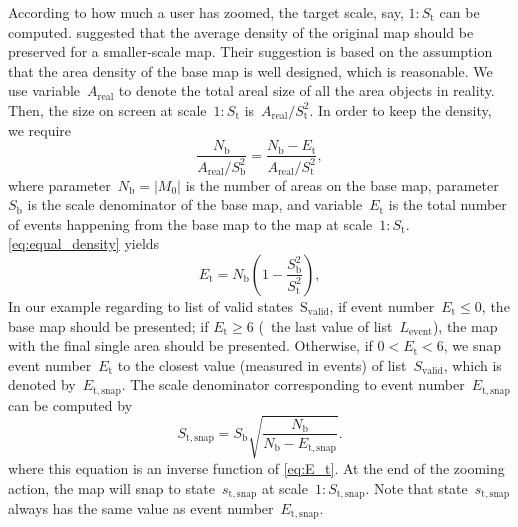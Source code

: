 \documentclass[]{interact}
\begin{document}
According to how much a user has zoomed,
the target scale, say, $1:S_\mathrm{t}$ can be computed.
\citet{Huang2016Webmap} suggested that 
the average density of the original map should be preserved 
for a smaller-scale map.
Their suggestion is based on the assumption that 
the area density of the base map is well designed, which is reasonable.
We use variable~$A_\mathrm{real}$ to denote the total areal size of 
all the area objects in reality.
Then, the size on screen at scale~$1:S_\mathrm{t}$ 
is~$A_\mathrm{real} \big/ S^2_\mathrm{t}$.
In order to keep the density, we require
\begin{equation}
\label{eq:equal_density}
\frac{N_\mathrm{b}}{A_\mathrm{real} \big/ S^2_\mathrm{b}} =
\frac{N_\mathrm{b}-E_\mathrm{t}}{A_\mathrm{real} \big/ S^2_\mathrm{t}},
\end{equation}
where parameter~$N_\mathrm{b} = |M_0|$ 
is the number of areas on the base map,
parameter~$S_\mathrm{b}$ is the scale denominator of the base map,
and variable~$E_\mathrm{t}$ is the total number of events 
happening from the base map to the map at scale~$1:S_\mathrm{t}$.
\eq\ref{eq:equal_density} yields
\begin{equation}
\label{eq:E_t}
E_\mathrm{t} = N_\mathrm{b} \left(1-\frac{S^2_\mathrm{b}}{S^2_\mathrm{t}}\right),
\end{equation}
In our example regarding to list of valid states~$\mathrm{S_\mathrm{valid}}$,
if event number~$E_\mathrm{t} \le 0$, the base map should be presented;
if $E_\mathrm{t} \ge 6$ (\ie~the last value of list~$L_\mathrm{event}$),
the map with the final single area should be presented.
Otherwise, if $0<E_\mathrm{t} < 6$, we snap event number~$E_\mathrm{t}$ 
to the closest value (measured in events) of list~$S_\mathrm{valid}$,
which is denoted by~$E_\mathrm{t,snap}$.
The scale denominator corresponding to event number~$E_\mathrm{t,snap}$
can be computed by 
\begin{equation}
\label{eq:S_t_snap}
S_\mathrm{t,snap} = S_\mathrm{b} \sqrt{\frac{N_\mathrm{b}}{N_\mathrm{b}-E_\mathrm{t,snap}}}.
\end{equation}
where this equation is an inverse function of \eq\ref{eq:E_t}.
At the end of the zooming action, 
the map will snap to state~$s_\mathrm{t,snap}$
at scale~$1:S_\mathrm{t,snap}$.
Note that state~$s_\mathrm{t,snap}$ always has 
the same value as event number~$E_\mathrm{t,snap}$.
\end{document}
